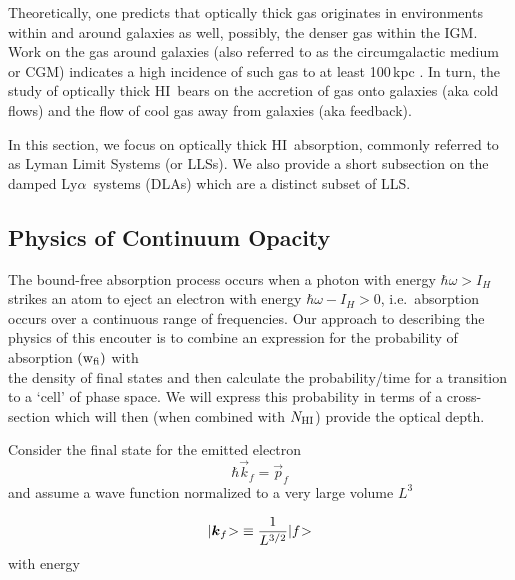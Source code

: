 \documentclass[graybox]{svmult}
\newcommand{\HI}{H{\sc I}}
\def\lya{Ly$\alpha$}
\def\ket#1{{|#1\negmedspace>}}
\newcommand{\mnhi}{N_{\rm HI}}
\newcommand{\nhi}{$\mnhi$}
\begin{document}
Theoretically, one predicts that optically thick gas originates 
in environments within and around galaxies as well, possibly,
the denser gas within the IGM.  Work on the gas
around galaxies (also referred to as the circumgalactic medium
or CGM) indicates a high incidence of such gas to at least 100\,kpc
\cite{bergeron,qpq5,p+17}.
In turn, the study of optically thick \HI\ bears
on the accretion of gas onto galaxies (aka cold flows) and
the flow of cool gas away from galaxies (aka feedback).

In this section, we focus on optically thick \HI\ absorption,
commonly referred to as Lyman Limit Systems (or LLSs).  We also
provide a short subsection on the damped \lya\ systems (DLAs)
which are a distinct subset of LLS.

\subsection{Physics of Continuum Opacity}

The bound-free absorption process occurs when a  
photon with energy $\hbar \omega > I_H$ strikes an atom 
to eject an electron with energy $\hbar\omega - I_H > 0$,
i.e.\ absorption occurs over a continuous range of frequencies.
Our approach to describing the physics of this encouter
is to combine an expression for the probability of absorption
$({\rm w_{fi}})$ with \\ the density of final states
and then calculate the probability/time for a transition to a 
`cell' of phase space.
We will express this probability in terms of a cross-section
which will then (when combined with \nhi)
provide the optical depth.

Consider the final state for the emitted electron
\begin{equation}
\hbar \vec k_f = \vec p_f
\end{equation}
and	assume a wave function normalized to a very large volume $L^3$

\begin{equation}
\ket{\vec k_f} \equiv \frac{1}{L^{3/2}} \ket{f}
\end{equation}
with energy  
\end{document}
